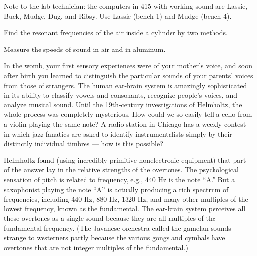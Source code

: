 \label{lab:resonances-of-sound}

Note to the lab technician: the computers in 415 with working sound are
Lassie, Buck, Mudge, Dug, and Ribsy. Use Lassie (bench 1) and Mudge (bench 4).

\apparatus
{}

\begin{goals}

\item[] Find the resonant frequencies of the air inside a
cylinder by two methods.

\item[] Measure the speeds of sound in air and in aluminum.
\end{goals}

\introduction

In the womb, your first sensory experiences were of your
mother's voice, and soon after birth you learned to
distinguish the particular sounds of your parents' voices
from those of strangers.  The human ear-brain system is
amazingly sophisticated in its ability to classify vowels
and consonants, recognize people's voices, and analyze
musical sound.  Until the 19th-century investigations of
Helmholtz, the whole process was completely mysterious.  How
could we so easily tell a cello from a violin playing the
same note?  A radio station in Chicago has a weekly contest
in which jazz fanatics are asked to identify instrumentalists
simply by their distinctly individual timbres --- how is this possible?

Helmholtz found (using incredibly primitive nonelectronic
equipment) that part of the answer lay in the relative
strengths of the overtones.  The psychological sensation of
pitch is related to frequency, e.g., 440 Hz is the note
``A.''  But a saxophonist playing the note ``A'' is actually
producing a rich spectrum of frequencies, including 440 Hz,
880 Hz, 1320 Hz, and many other multiples of the lowest
frequency, known as the fundamental.  The ear-brain system
perceives all these overtones as a single sound because they
are all multiples of the fundamental frequency.  (The
Javanese orchestra called the gamelan sounds strange to
westerners partly because the various gongs and cymbals have
overtones that are not integer multiples of the fundamental.)

